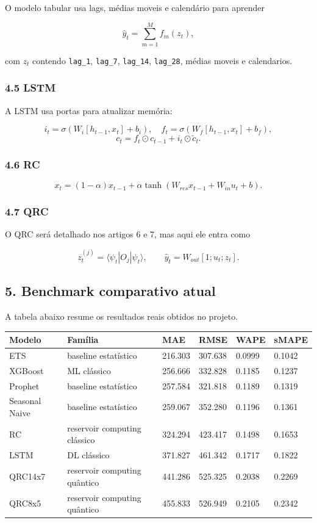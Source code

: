 \documentclass[12pt]{article}
\begin{document}
O modelo tabular usa lags, médias moveis e calendário para aprender

\[
\hat{y}_t = \sum_{m=1}^M f_m(z_t),
\]

com \(z_t\) contendo \texttt{lag\_1}, \texttt{lag\_7}, \texttt{lag\_14}, \texttt{lag\_28}, médias moveis e calendarios.

\subsubsection{4.5 LSTM}\label{45-lstm}

A LSTM usa portas para atualizar memória:

\[
i_t = \sigma(W_i [h_{t-1}, x_t] + b_i), \quad
f_t = \sigma(W_f [h_{t-1}, x_t] + b_f),
\]
\[
c_t = f_t \odot c_{t-1} + i_t \odot \tilde{c}_t.
\]

\subsubsection{4.6 RC}\label{46-rc}

\[
x_t = (1 - \alpha) x_{t-1} + \alpha \tanh(W_{res} x_{t-1} + W_{in} u_t + b).
\]

\subsubsection{4.7 QRC}\label{47-qrc}

O QRC será detalhado nos artigos 6 e 7, mas aqui ele entra como

\[
z_t^{(j)} = \langle \psi_t | O_j | \psi_t \rangle,
\qquad
\hat{y}_t = W_{out} [1; u_t; z_t].
\]

\subsection{5. Benchmark comparativo atual}\label{5-benchmark-comparativo-atual}

A tabela abaixo resume os resultados reais obtidos no projeto.

\begin{longtable}[]{@{}llllll@{}}
\toprule\noalign{}
Modelo & Família & MAE & RMSE & WAPE & sMAPE \\
\midrule\noalign{}
\endhead
\bottomrule\noalign{}
\endlastfoot
ETS & baseline estatístico & 216.303 & 307.638 & 0.0999 & 0.1042 \\
XGBoost & ML clássico & 256.666 & 332.828 & 0.1185 & 0.1237 \\
Prophet & baseline estatístico & 257.584 & 321.818 & 0.1189 & 0.1319 \\
Seasonal Naive & baseline estatístico & 259.067 & 352.280 & 0.1196 & 0.1361 \\
RC & reservoir computing clássico & 324.294 & 423.417 & 0.1498 & 0.1653 \\
LSTM & DL clássico & 371.827 & 461.342 & 0.1717 & 0.1822 \\
QRC14x7 & reservoir computing quântico & 441.286 & 525.325 & 0.2038 & 0.2269 \\
QRC8x5 & reservoir computing quântico & 455.833 & 526.949 & 0.2105 & 0.2342 \\
\end{longtable}
\end{document}
